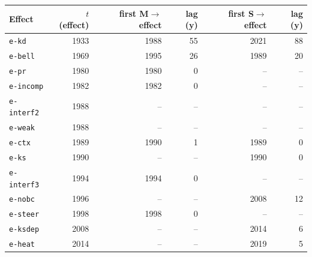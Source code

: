 \begin{tabular}{@{}lrrrrr@{}}\toprule
Effect & $t$(effect) & first M$\to$effect & lag (y) & first S$\to$effect & lag (y) \\\midrule
\texttt{e-kd} & 1933 & 1988 & 55 & 2021 & 88 \\
\texttt{e-bell} & 1969 & 1995 & 26 & 1989 & 20 \\
\texttt{e-pr} & 1980 & 1980 & 0 & -- & -- \\
\texttt{e-incomp} & 1982 & 1982 & 0 & -- & -- \\
\texttt{e-interf2} & 1988 & -- & -- & -- & -- \\
\texttt{e-weak} & 1988 & -- & -- & -- & -- \\
\texttt{e-ctx} & 1989 & 1990 & 1 & 1989 & 0 \\
\texttt{e-ks} & 1990 & -- & -- & 1990 & 0 \\
\texttt{e-interf3} & 1994 & 1994 & 0 & -- & -- \\
\texttt{e-nobc} & 1996 & -- & -- & 2008 & 12 \\
\texttt{e-steer} & 1998 & 1998 & 0 & -- & -- \\
\texttt{e-ksdep} & 2008 & -- & -- & 2014 & 6 \\
\texttt{e-heat} & 2014 & -- & -- & 2019 & 5 \\
\bottomrule\end{tabular}
